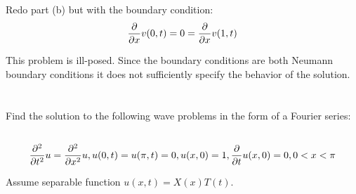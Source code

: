 \documentclass[12pt,USLetter]{article}
\begin{document}
\subsection{}

Redo part (b) but with the boundary condition:
\begin{equation*}
\frac{\partial}{\partial{x}}v(0,t) = 0 = \frac{\partial}{\partial{x}}v (1, t)
\end{equation*}

This problem is ill-posed. Since the boundary conditions are both Neumann boundary conditions it does not sufficiently specify the behavior of the solution.

\section{}

Find the solution to the following wave problems in the form of a Fourier series:

\subsection{}

\begin{equation*}
\frac{\partial^2}{\partial{t}^2}u = \frac{\partial^2}{\partial{x}^2}u, u(0,t) = u(\pi, t) = 0, u(x,0) = 1, \frac{\partial}{\partial{t}}u(x,0) = 0, 0<x<\pi
\end{equation*}

Assume separable function $u(x,t) = X(x)T(t)$.
\end{document}
